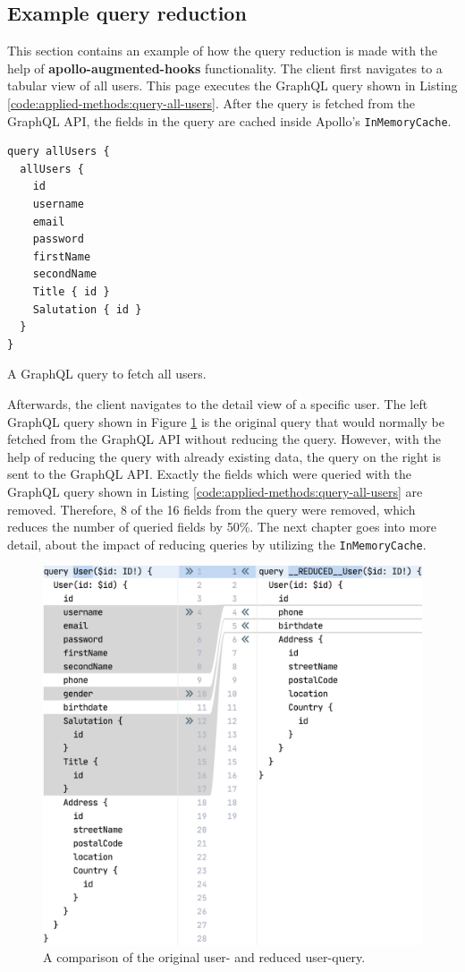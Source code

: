 \subsection{Example query reduction}\label{subsection:background:graphql:example-reduction}

This section contains an example of how the query reduction is made with the help of \textbf{apollo-augmented-hooks} functionality. The client first navigates to a tabular view of all users. This page executes the GraphQL query shown in Listing \ref{code:applied-methods:query-all-users}. After the query is fetched from the GraphQL \ac{API}, the fields in the query are cached inside Apollo's \texttt{InMemoryCache}.

\ifshowListings
\begin{listing}[H]
\begin{verbatim}
query allUsers {
  allUsers {
    id
    username
    email
    password
    firstName
    secondName
    Title { id }
    Salutation { id }
  }
}
\end{verbatim}
\caption{A GraphQL query to fetch all users.}\label{code:applied-methods:query-all-users}
\end{listing}
\fi

\noindent Afterwards, the client navigates to the detail view of a specific user. The left GraphQL query shown in Figure \ref{fig:applied-methods:comparison-user-reduced-user} is the original query that would normally be fetched from the GraphQL \ac{API} without reducing the query. However, with the help of reducing the query with already existing data, the query on the right is sent to the GraphQL \ac{API}. Exactly the fields which were queried with the GraphQL query shown in Listing \ref{code:applied-methods:query-all-users} are removed. Therefore, 8 of the 16 fields from the query were removed, which reduces the number of queried fields by 50\%. The next chapter goes into more detail, about the impact of reducing queries by utilizing the \texttt{InMemoryCache}.

\ifshowImages
  \begin{figure}[H]
  \centering
  \includegraphics[width=0.65\linewidth]{images/reduction-graphql-examples/compare-user-reduced-user.png}
  \caption{A comparison of the original user- and reduced user-query.}\label{fig:applied-methods:comparison-user-reduced-user}
  \end{figure}
\fi

